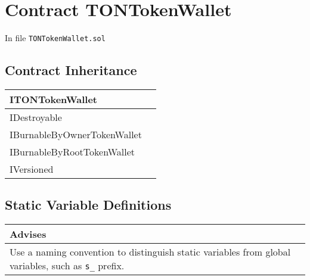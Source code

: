 
\chapter{Contract TONTokenWallet}


In file {\tt TONTokenWallet.sol}

\section{Contract Inheritance}


\noindent\begin{tabular}{|l|p{5cm}|}\hline
ITONTokenWallet & \\\hline
IDestroyable & \\\hline
IBurnableByOwnerTokenWallet & \\\hline
IBurnableByRootTokenWallet & \\\hline
IVersioned & \\\hline
\end{tabular}


\section{Static Variable Definitions}


\ifsoldraft
\noindent\begin{tabular}{|p{12cm}|}\hline
\rowcolor{green}Advises
\\\hline
Use a naming convention to distinguish static variables from global variables, such as \verb+s_+ prefix.
\\\hline\end{tabular}
\fi

